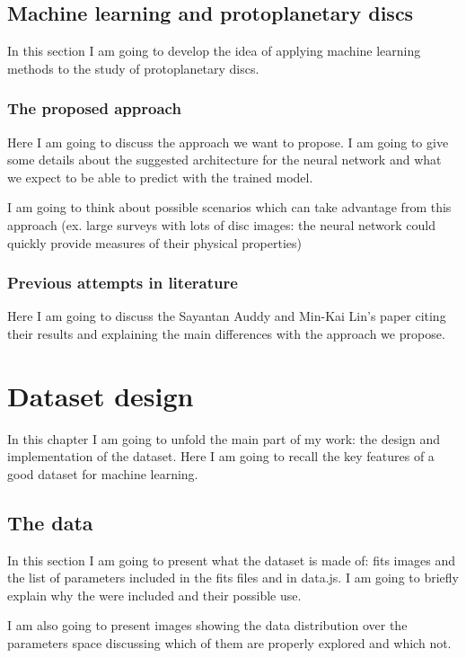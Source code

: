 \documentclass[a4paper,10pt]{report}
\begin{document}
\section{Machine learning and protoplanetary discs}

In this section I am going to develop the idea of applying machine learning methods to the  study of protoplanetary
discs.

\subsection{The proposed approach}

Here I am going to discuss the approach we want to propose.
 I am going to give some details about the 
suggested architecture for the neural network and what 
we expect to be able to predict with the trained
model.

I am going to think about possible scenarios which can take advantage from this approach
(ex. large surveys with lots of disc images: the neural network could quickly provide measures of their physical properties)

\subsection{Previous attempts in literature}

Here I am going to discuss the Sayantan Auddy and Min-Kai Lin's paper citing their results
and explaining the main differences with the approach we propose.

\chapter{Dataset design}

In this chapter I am going to unfold the main part of my work: the design and implementation of the dataset.
Here I am going to recall the key features of a good dataset for machine learning.

\section{The data}

In this section I am going to present what the dataset is made of: fits images and the list of parameters included in the fits files 
and in data.js. I am going to briefly explain why the were included and their possible use.

I am also going to present images showing the data distribution over the parameters space discussing
 which of them are properly explored and which not.
\end{document}
